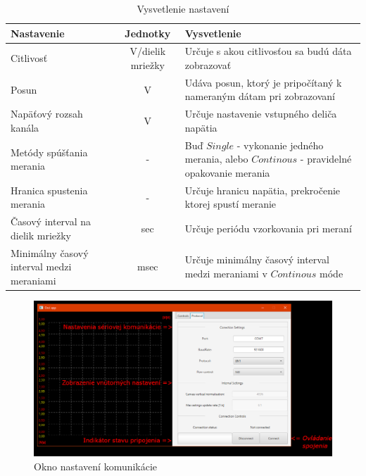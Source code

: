 \documentclass[main.tex]{subfiles}
\begin{document}
		\begin{table}
			\begin{tabular}{p{5cm}|c|p{5cm}}
				Nastavenie & Jednotky & Vysvetlenie \\
				\hline
				Citlivosť & V/dielik mriežky & Určuje s akou citlivosťou sa budú dáta zobrazovať \\
				Posun & V & Udáva posun, ktorý je pripočítaný k nameraným dátam pri zobrazovaní \\ 
				Napäťový rozsah kanála & V & Určuje nastavenie vstupného deliča napätia \\ 
				Metódy spúšťania merania & - & Buď $Single$ - vykonanie jedného merania, alebo $Continous$ - pravidelné opakovanie merania\\ 
				Hranica spustenia merania & - & Určuje hranicu napätia, prekročenie ktorej spustí meranie\\ 
				Časový interval na dielik mriežky & sec & Určuje periódu vzorkovania pri meraní \\
				Minimálny časový interval medzi meraniami & msec & Určuje minimálny časový interval medzi meraniami v $Continous$ móde \\
			\end{tabular}
			\caption{Vysvetlenie nastavení}
			\label{tab:GUIVysvetlenieNastaveni}
		\end{table}
		\begin{figure}
			\centering
			\includegraphics[width=\linewidth]{../Obrazky/GUINastaveniaKomunikacie}
			\caption{Okno nastavení komunikácie}
			\label{fig:GUINastaveniaKomunikacie}
		\end{figure}
\end{document}

